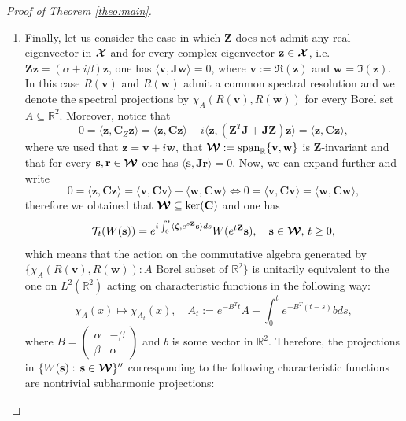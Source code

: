 \documentclass[preprint]{elsarticle}
\theoremstyle{definition}
\def\RR{\mathbb{R}}
\def\TT{\mathcal{T}}
\begin{document}
\begin{proof}[Proof of Theorem \ref{theo:main}]
\begin{enumerate}
\item Finally, let us consider the case in which $\mathbf{Z}$ does not admit any real eigenvector in $\boldsymbol{{\cal X}}$ and for every complex eigenvector $\mathbf{z} \in \boldsymbol{{\cal X}}$, i.e. $\mathbf{Z} \mathbf{z}=(\alpha+i\beta)\mathbf{z}$, one has $\langle \mathbf{v}, \mathbf{J}\mathbf{w} \rangle= 0$, where $\mathbf{v}:=\Re(\mathbf{z})$ and $\mathbf{w}=\Im(\mathbf{z})$. In this case $R(\mathbf{v})$ and $R(\mathbf{w})$ admit a common spectral resolution and we denote the spectral projections by $\chi_{A}(R(\mathbf{v}),R(\mathbf{w})) $ for every Borel set $A \subseteq \RR^{2}$. Moreover, notice that
$$
0=\langle \mathbf{z},\mathbf{C}_{Z}\mathbf{z} \rangle=\langle \mathbf{z},\mathbf{C}\mathbf{z}\rangle -i\langle \mathbf{z},(\mathbf{Z}^T\mathbf{J}+\mathbf{J}\mathbf{Z})\mathbf{z} \rangle=\langle \mathbf{z},\mathbf{C}\mathbf{z}\rangle,$$
where we used that $\mathbf{z}=\mathbf{v}+i\mathbf{w}$, that $\boldsymbol{{\cal W}}:={\rm span}_{\RR}\{\mathbf{v}, \mathbf{w}\}$ is $\mathbf{Z}$-invariant and that for every $\mathbf{s}, \mathbf{r}\in \boldsymbol{{\cal W}}$ one has $\langle \mathbf{s}, \mathbf{J} \mathbf{r} \rangle=0$. Now, we can expand further and write
$$0=\langle \mathbf{z},\mathbf{C}\mathbf{z}\rangle=\langle \mathbf{v}, \mathbf{C}\mathbf{v} \rangle + \langle \mathbf{w}, \mathbf{C}\mathbf{w} \rangle \Leftrightarrow 0=\langle \mathbf{v}, \mathbf{C}\mathbf{v} \rangle = \langle \mathbf{w}, \mathbf{C}\mathbf{w} \rangle, $$
therefore we obtained that $\boldsymbol{{\cal W}} \subseteq \ker(\mathbf{C})$ and one has
$$\TT_t(W(\mathbf{s}))=e^{i \int_0^t\langle \boldsymbol{\zeta},e^{s\mathbf{Z}}\mathbf{s} \rangle ds}W(e^{t \mathbf{Z}}\mathbf{s}), \quad \mathbf{s} \in \boldsymbol{{\cal W}}, \, t \geq 0,$$
which means that the action on the commutative algebra generated by $\{\chi_{A}(R(\mathbf{v}), R(\mathbf{w})): A \text{ Borel subset of } \RR^2\}$ is unitarily equivalent to the one on $L^2(\RR^2)$ acting on characteristic functions in the following way:
$$\chi_A(x) \mapsto \chi_{A_t}(x), \quad A_t:=e^{-B^Tt}A-\int_0^te^{-B^T(t-s)}bds,$$
where $B=\begin{pmatrix} \alpha & -\beta\\
\beta & \alpha \end{pmatrix}$ and $b$ is some vector in $\RR^2.$
Therefore, the projections in $\{W(\mathbf{s}):\, \mathbf{s} \in \boldsymbol{{\cal W}}\}^{\prime\prime}$ corresponding to the following characteristic functions are nontrivial subharmonic projections:
\begin{itemize}

\end{itemize}
\end{enumerate}
\end{proof}
\end{document}

